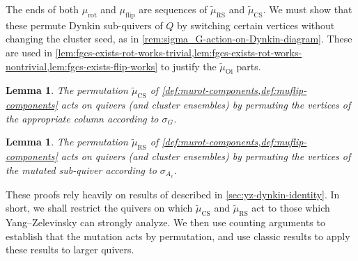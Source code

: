 \documentclass{amsart}
\theoremstyle{plain}
\newtheorem{lemma}[theorem]{Lemma}
\theoremstyle{definition}
\theoremstyle{remark}
\newcommand{\muflip}{{\mu_{\text{flip}}}}
\newcommand{\murot}{{\mu_{\text{rot}}}}
\newcommand{\muint}[1]{\widetilde{\mu}_{\text{#1}}}
\newcommand{\murowperm}{\muint{RS}}
\newcommand{\mucolperm}{\muint{CS}}
\begin{document}
  The ends of both $\murot$ and $\muflip$ are sequences of $\murowperm$
  and $\mucolperm$. We must show that these permute Dynkin sub-quivers
  of $Q$ by switching certain vertices without changing the cluster
  seed, as in \cref{rem:sigma_G-action-on-Dynkin-diagram}. These are
  used in \cref{lem:fgcs-exists-rot-works-trivial,lem:fgcs-exists-rot-works-nontrivial,lem:fgcs-exists-flip-works}
  to justify the $\muint{Oi}$ parts.

  \begin{lemma}
    \label{lem:colsigmaG-does-sigmaG}
    The permutation $\mucolperm$ of
    \cref{def:murot-components,def:muflip-components} acts on quivers
    (and cluster ensembles) by permuting the vertices of the appropriate
    column according to $\sigma_G$.
  \end{lemma}
  \begin{lemma}
    \label{lem:rowsigmaG-does-sigmaG}
    The permutation $\murowperm$ of
    \cref{def:murot-components,def:muflip-components} acts on quivers
    (and cluster ensembles) by permuting the vertices of the mutated
    sub-quiver according to $\sigma_{A_{\ell}}$.
  \end{lemma}

  These proofs rely heavily on results of \cite{yangzelevinsky2008}
  described in \cref{sec:yz-dynkin-identity}. In short, we shall
  restrict the quivers on which $\mucolperm$ and $\murowperm$ act to
  those which Yang--Zelevinsky can strongly analyze. We then use
  counting arguments to establish that the mutation acts by permutation,
  and use classic results to apply these results to larger quivers.
\end{document}
